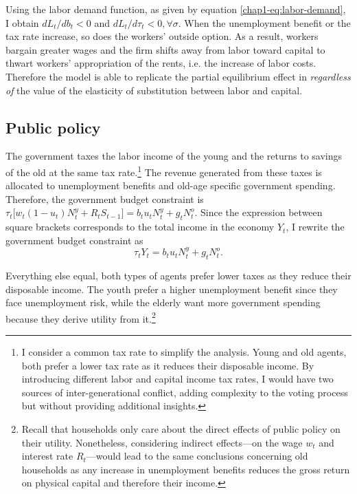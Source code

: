 Using the labor demand function, as given by equation \eqref{chap1-eq:labor-demand}, I obtain $dL_t/db_t<0$ and $dL_t/d\tau_t<0, \forall \sigma$. When the unemployment benefit or the tax rate increase, so does the workers' outside option. As a result, workers bargain greater wages and the firm shifts away from labor toward capital to thwart workers' appropriation of the rents, i.e. the increase of labor costs. Therefore the model is able to replicate the partial equilibrium effect in \citet{Caballero1998Jobless} \textit{regardless of} the value of the elasticity of substitution between labor and capital.

\subsection{Public policy}\label{chap1-public-policy}

The government taxes the labor income of the young and the returns to savings of the old at the same tax rate.\footnote{I consider a common tax rate to simplify the analysis. Young and old agents, both prefer a lower tax rate as it reduces their disposable income. By introducing different labor and capital income tax rates, I would have two sources of inter-generational conflict, adding complexity to the voting process but without providing additional insights.} The revenue generated from these taxes is allocated to unemployment benefits and old-age specific government spending. Therefore, the government budget constraint is $\tau_t\Big[ w_t(1-u_t)N^y_t + R_t S_{t-1} \Big] = b_t u_t N^y_t + g_t N^o_t$. Since the expression between square brackets corresponds to the total income in the economy $Y_t$, I rewrite the government budget constraint as
\begin{equation}\label{chap1-eq:gov-budget}
    \tau_t Y_t = b_t u_t N^y_t + g_t N^o_t.
\end{equation}

Everything else equal, both types of agents prefer lower taxes as they reduce their disposable income. The youth prefer a higher unemployment benefit since they face unemployment risk, while the elderly want more government spending because they derive utility from it.\footnote{Recall that households only care about the direct effects of public policy on their utility. Nonetheless, considering indirect effects---on the wage $w_t$ and interest rate $R_t$---would lead to the same conclusions concerning old households as any increase in unemployment benefits reduces the gross return on physical capital and therefore their income.} 

